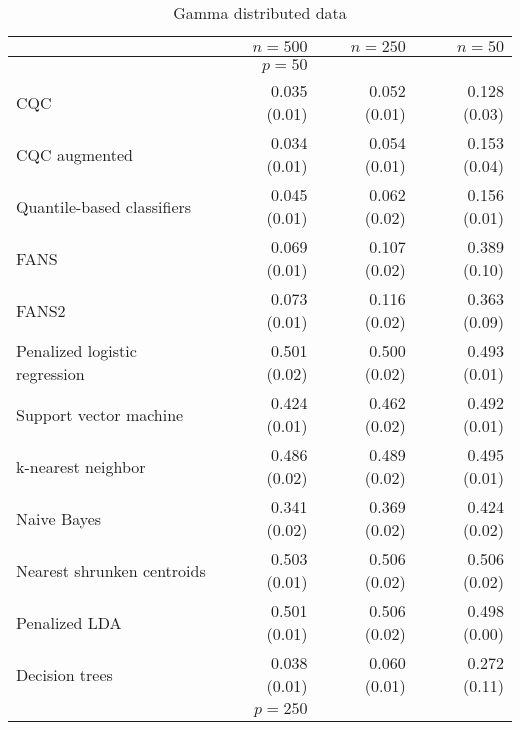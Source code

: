\begin{table}[p]
  \centering
  \caption{Gamma distributed data}
  \label{tab:gamma}
  \vspace{5mm}
  
  \begin{adjustbox}{max size={\textwidth}{10cm}}
    \begin{tabular}{l@{\extracolsep{15mm}}rrr}
      
      \hline
      & $n=500$ & $n=250$ & $n=50$ \\ 
      \hline
      & $p = 50$ \\
      \hline

      CQC & 0.035 (0.01) & 0.052 (0.01) & 0.128 (0.03) \\ 
      CQC augmented & 0.034 (0.01) & 0.054 (0.01) & 0.153 (0.04) \\ 
      Quantile-based classifiers & 0.045 (0.01) & 0.062 (0.02) & 0.156 (0.01) \\ 
      FANS  & 0.069 (0.01) & 0.107 (0.02) & 0.389 (0.10) \\
      FANS2 & 0.073 (0.01) & 0.116 (0.02) & 0.363 (0.09) \\
      Penalized logistic regression & 0.501 (0.02) & 0.500 (0.02) & 0.493 (0.01) \\ 
      Support vector machine & 0.424 (0.01) & 0.462 (0.02) & 0.492 (0.01) \\ 
      k-nearest neighbor & 0.486 (0.02) & 0.489 (0.02) & 0.495 (0.01) \\ 
      Naive Bayes & 0.341 (0.02) & 0.369 (0.02) & 0.424 (0.02) \\ 
      Nearest shrunken centroids & 0.503 (0.01) & 0.506 (0.02) & 0.506 (0.02) \\ 
      Penalized LDA & 0.501 (0.01) & 0.506 (0.02) & 0.498 (0.00) \\ 
      Decision trees & 0.038 (0.01) & 0.060 (0.01) & 0.272 (0.11) \\ [2ex]

      \hline
      & $p = 250$ \\
      \hline


\end{tabular}
\end{adjustbox}
\end{table}
